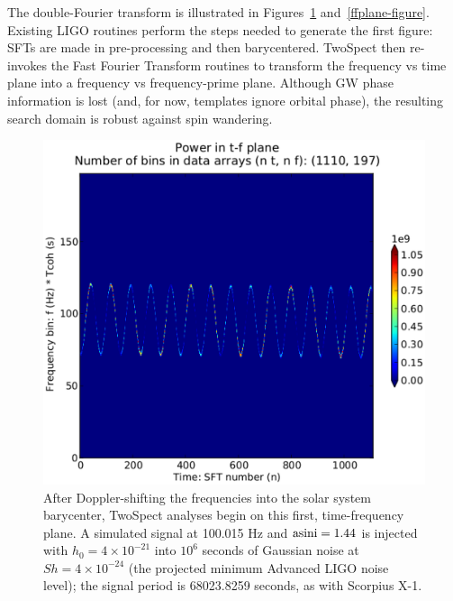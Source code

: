 The double-Fourier transform is illustrated in Figures~\ref{tfplane-figure} and~\ref{ffplane-figure}.
Existing LIGO routines perform the steps needed to generate the first figure: SFTs are made in pre-processing and then barycentered.
TwoSpect then re-invokes the Fast Fourier Transform routines to transform the frequency vs time plane into a frequency vs frequency-prime plane.
Although GW phase information is lost (and, for now, templates ignore orbital phase), the resulting search domain is robust against spin wandering.

\begin{figure}
\begin{center}
\includegraphics[trim=20 15 80 5, clip, width=0.7\paperwidth,height=0.35\paperheight]{tfplane-4e21-on-4e24.eps}
\caption{After Doppler-shifting the frequencies into the solar system barycenter, TwoSpect analyses begin on this first, time-frequency plane. A simulated signal at 100.015 Hz and $\textup{asini} = 1.44$ is injected with $h_0 = 4\times 10^{-21}$ into $10^6$ seconds of Gaussian noise at $Sh = 4 \times 10^{-24}$ (the projected minimum Advanced LIGO noise level); the signal period is 68023.8259 seconds, as with Scorpius X-1.}
\label{tfplane-figure}
\end{center}
\end{figure}

